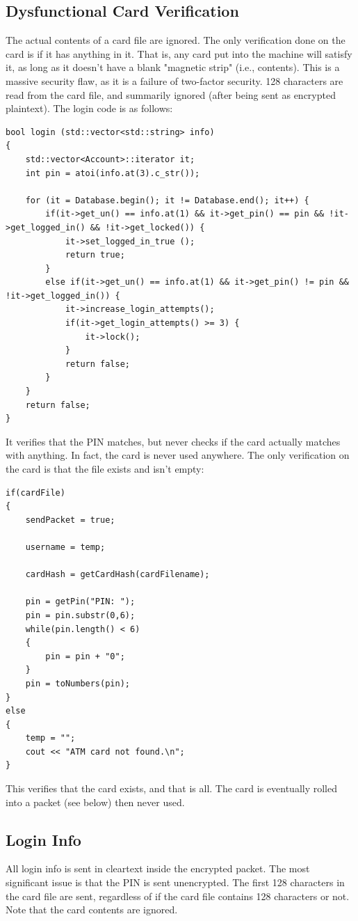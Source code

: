 \documentclass{article}
\begin{document}
\subsection{Dysfunctional Card Verification}
The actual contents of a card file are ignored. The only verification done on the card is if it has anything in it. That is, any card put into the machine will satisfy it, as long as it doesn't have a blank "magnetic strip" (i.e., contents). This is a massive security flaw, as it is a failure of two-factor security. 128 characters are read from the card file, and summarily ignored (after being sent as encrypted plaintext). The login code is as follows:
\begin{lstlisting}
bool login (std::vector<std::string> info) 
{
	std::vector<Account>::iterator it;
	int pin = atoi(info.at(3).c_str());

	for (it = Database.begin(); it != Database.end(); it++) {
        if(it->get_un() == info.at(1) && it->get_pin() == pin && !it->get_logged_in() && !it->get_locked()) {
	        it->set_logged_in_true ();
	        return true;
        } 
		else if(it->get_un() == info.at(1) && it->get_pin() != pin && !it->get_logged_in()) {
			it->increase_login_attempts();
			if(it->get_login_attempts() >= 3) {
				it->lock();
			}
			return false;
		}
	}
	return false;
}
\end{lstlisting}
It verifies that the PIN matches, but never checks if the card actually matches with anything. In fact, the card is never used anywhere. The only verification on the card is that the file exists and isn't empty:
\begin{lstlisting}
if(cardFile)
{
    sendPacket = true; 

    username = temp;

    cardHash = getCardHash(cardFilename);

    pin = getPin("PIN: ");
    pin = pin.substr(0,6);
    while(pin.length() < 6)
    {
        pin = pin + "0";
    }
    pin = toNumbers(pin);
}
else
{
    temp = "";
    cout << "ATM card not found.\n";
}
\end{lstlisting}
This verifies that the card exists, and that is all. The card is eventually rolled into a packet (see below) then never used.

\subsection{Login Info}
All login info is sent in cleartext inside the encrypted packet. The most 
significant issue is that the PIN is sent unencrypted. The first 128 characters 
in the card file are sent, regardless of if the card file contains 128 characters 
or not. Note that the card contents are ignored. 
\end{document}
